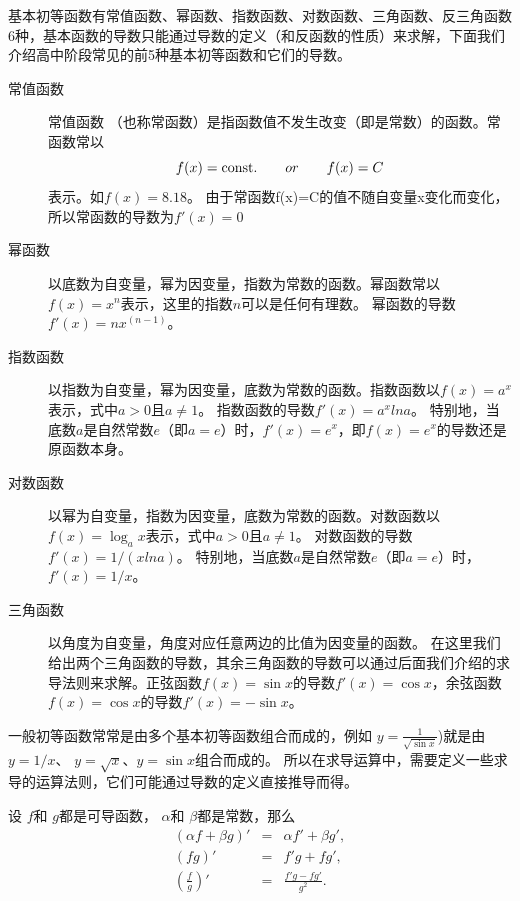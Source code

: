 
 基本初等函数有常值函数、幂函数、指数函数、对数函数、三角函数、反三角函数 6种，基本函数的导数只能通过导数的定义（和反函数的性质）来求解，下面我们介绍高中阶段常见的前5种基本初等函数和它们的导数。
 
 
 \begin{description}
 	\item[常值函数]  常值函数 （也称常函数）是指函数值不发生改变（即是常数）的函数。常函数常以
 	\[
 	f(x) = \text{const.} \qquad or \qquad f(x) = C
 	\]
 表示。如$ f(x)=8.18 $。
 	由于常函数f(x)=C的值不随自变量x变化而变化，所以常函数的导数为$ f' (x)=0 $
 	
 	\item[幂函数] 以底数为自变量，幂为因变量，指数为常数的函数。幂函数常以$ f(x)=x^n $表示，这里的指数$ n $可以是任何有理数。
 	幂函数的导数$ f' (x)=nx^(n-1) $。
 	
 	\item[指数函数]以指数为自变量，幂为因变量，底数为常数的函数。指数函数以$ f(x)=a^x $表示，式中$ a>0 $且$ a\neq 1 $。
 	指数函数的导数$ f' (x)=a^x ln⁡a $。
 	特别地，当底数$ a $是自然常数$ e $（即$ a=e $）时，$ f' (x)=e^x $，即$ f(x)=e^x $的导数还是原函数本身。
 	\item[对数函数]以幂为自变量，指数为因变量，底数为常数的函数。对数函数以$f(x)=\log_a⁡x$表示，式中$ a>0 $且$ a\neq 1 $。
 	对数函数的导数$ f' (x)=1/(xln⁡a) $。
 	特别地，当底数$ a $是自然常数$ e $（即$ a=e $）时，$ f' (x)=1/x $。
 	\item[三角函数]以角度为自变量，角度对应任意两边的比值为因变量的函数。
 	在这里我们给出两个三角函数的导数，其余三角函数的导数可以通过后面我们介绍的求导法则来求解。正弦函数$ f(x)=\sin ⁡x $的导数$ f' (x)=\cos⁡ x $，余弦函数$ f(x)=\cos⁡ x $的导数$ f' (x)=-\sin ⁡x $。
 \end{description}


 一般初等函数常常是由多个基本初等函数组合而成的，例如 $ y=\frac{1}{\sqrt{\sin x}}⁡ $)就是由 $ y=1/x $、 $ y=\sqrt{x} $、$  y=\sin⁡x $组合而成的。
 所以在求导运算中，需要定义一些求导的运算法则，它们可能通过导数的定义直接推导而得。
 
  设 $ f $和 $ g $都是可导函数， $ \alpha $和 $ \beta $都是常数，那么
  \begin{eqnarray}
  	(\alpha f+\beta g)' &=& \alpha f'+\beta g',\\
  	(fg)'&=&f'g+fg',\\
  	\left( \frac{f}{g} \right)'&=&\frac{f'g-fg'}{g^2}. 
  \end{eqnarray}


